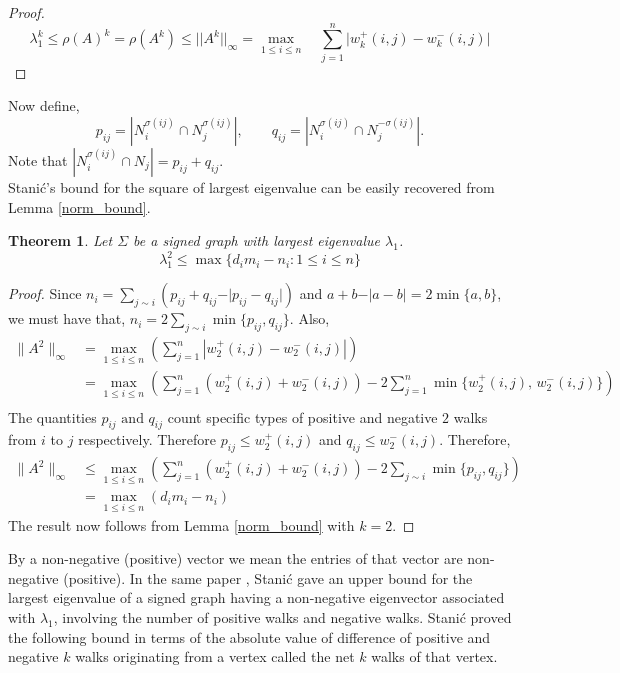 \documentclass[12pt]{article}
\theoremstyle{plain}
\newtheorem{theorem}{Theorem}[section]
\numberwithin{equation}{section}
\begin{document}
	\begin{proof}
		$$\lambda_1^k \leq \rho(A)^k= \rho(A^k) \leq \vert \vert A^k \vert \vert_{\infty}=\max \limits_{1\leq i \leq n}\quad\sum \limits_{j=1}^{n}\vert w_k^+(i,j)-w_k^-(i,j)\vert$$
	\end{proof}
	Now define, \[
	p_{ij}
	=
	\left|N_i^{\sigma(ij)}\cap N_j^{\sigma(ij)}\right|,
	\qquad
	q_{ij}
	=
	\left|N_i^{\sigma(ij)}\cap N_j^{-\sigma(ij)}\right|.
	\]
	Note that $\left|N_i^{\sigma(ij)}\cap N_j\right|= p_{ij}+q_{ij}$. \\
	Stani\'{c}'s bound for the square of largest eigenvalue can be easily recovered from Lemma \ref{norm_bound}.
	\begin{theorem}
		Let $\Sigma$ be a signed graph with largest eigenvalue $\lambda_1$. 
		$$\lambda_1^2 \leq \max \{d_im_i-n_i : 1 \leq i \leq n \}$$
	\end{theorem}
	\begin{proof}
		Since $n_i= \sum \limits_{j \sim i}\left(p_{ij}+q_{ij}-\vert p_{ij}-q_{ij} \vert\right) $ and $a+b -\vert a - b \vert=2\min\{a,b\}$, we must have that, $n_i= 2\sum \limits_{j \sim i}\min\{p_{ij},q_{ij}\}$.
		Also,
		\begin{align*}
			\|A^2\|_{\infty}
			&=\max_{1\le i\le n}\left(\sum_{j=1}^{n}
			\left|w_2^+(i,j)-w_2^-(i,j)\right|\right)\\
			&=\max_{1\le i\le n}\left(\sum_{j=1}^{n}
			\left(
			w_2^+(i,j)+w_2^-(i,j)\right)
			-2 \sum_{j=1}^{n}\min\{w_2^+(i,j),\,w_2^-(i,j)\}\right)
			\\
		\end{align*}
		The quantities $p_{ij} \text{ and }q_{ij}$ count specific types of positive and negative $2$ walks from $i$ to $j$ respectively. Therefore $p_{ij} \leq w_2^+(i,j)$ and $q_{ij} \leq w_2^-(i,j)$. Therefore,\\
		\begin{align*}
			\|A^2\|_{\infty}
			&\leq \max_{1\le i\le n}\left(\sum_{j=1}^{n}
			\left(
			w_2^+(i,j)+w_2^-(i,j)\right)
			-2 \sum_{j \sim i}\min\{p_{ij},q_{ij}\}\right)
			\\
			&=\max_{1\le i\le n} (d_im_i-n_i)  
		\end{align*}
		The result now follows from Lemma \ref{norm_bound} with $k=2$.
	\end{proof}
	By a non-negative (positive) vector we mean the entries of that vector are non-negative (positive). In the same paper \cite{Stanic2019bounding}, Stani{\'c} gave an upper bound for the largest eigenvalue of a signed graph having a non-negative eigenvector associated with $\lambda_1$, involving the number of positive walks and negative walks. Stani{\'c} proved the following bound in terms of the absolute value of difference of positive and negative $k$ walks originating from a vertex called the net $k$ walks of that vertex. 
	
\end{document}
